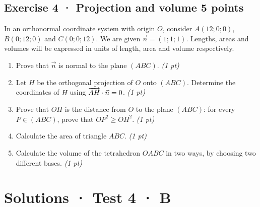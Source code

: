 \subsection*{Exercise 4 · Projection and volume \hfill 5 points}In an orthonormal coordinate system with origin $O$, consider $A(12;0;0)$, $B(0;12;0)$ and $C(0;0;12)$. We are given $\vec n=(1;1;1)$. Lengths, areas and volumes will be expressed in units of length, area and volume respectively.

\begin{enumerate}

\item Prove that $\vec n$ is normal to the plane $(ABC)$. \hfill\textit{(1 pt)}

\item Let $H$ be the orthogonal projection of $O$ onto $(ABC)$. Determine the coordinates of $H$ using $\overrightarrow{AH}\cdot\vec n=0$. \hfill\textit{(1 pt)}

\item Prove that $OH$ is the distance from $O$ to the plane $(ABC)$: for every $P\in(ABC)$, prove that $OP^2\ge OH^2$. \hfill\textit{(1 pt)}

\item Calculate the area of triangle $ABC$. \hfill\textit{(1 pt)}

\item Calculate the volume of the tetrahedron $OABC$ in two ways, by choosing two different bases. \hfill\textit{(1 pt)}

\end{enumerate}

\ifprof\clearpage

\section*{Solutions · Test 4 · B}\label{cor:6-4}

